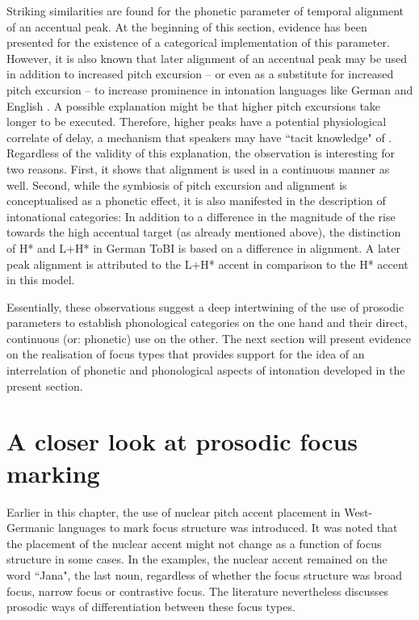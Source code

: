 Striking similarities are found for the phonetic parameter of temporal alignment of an accentual peak. At the beginning of this section, evidence has been presented for the existence of a categorical implementation of this parameter. However, it is also known that later alignment of an accentual peak may be used in addition to increased pitch excursion -- or even as a substitute for increased pitch excursion -- to increase prominence in intonation languages like German and English \citep{Gussenhoven2004, LaddMorton1997}. A possible explanation might be that higher pitch excursions take longer to be executed. Therefore, higher peaks have a potential physiological correlate of delay, a mechanism that speakers may have ``tacit knowledge" of \citep[90]{Gussenhoven2004}. Regardless of the validity of this explanation, the observation is interesting for two reasons. First, it shows that alignment is used in a continuous manner as well. Second, while the symbiosis of pitch excursion and alignment is conceptualised as a phonetic effect, it is also manifested in the description of intonational categories: In addition to a difference in the magnitude of the rise towards the high accentual target (as already mentioned above), the distinction of H* and L+H* in German ToBI is based on a difference in alignment. A later peak alignment is attributed to the L+H* accent in comparison to the H* accent in this model.

Essentially, these observations suggest a deep intertwining of the use of prosodic parameters to establish phonological categories on the one hand and their direct, continuous (or: phonetic) use on the other. The next section will present evidence on the realisation of focus types that provides support for the idea of an interrelation of phonetic and phonological aspects of intonation developed in the present section.

\section{A closer look at prosodic focus marking}
\label{sec:focus2}

Earlier in this chapter, the use of nuclear pitch accent placement in West-German\-ic languages to mark focus structure was introduced. It was noted that the placement of the nuclear accent might not change as a function of focus structure in some cases. In the examples, the nuclear accent remained on the word ``Jana", the last noun, regardless of whether the focus structure was broad focus, narrow focus or contrastive focus. The literature nevertheless discusses prosodic ways of  differentiation between these focus types.

